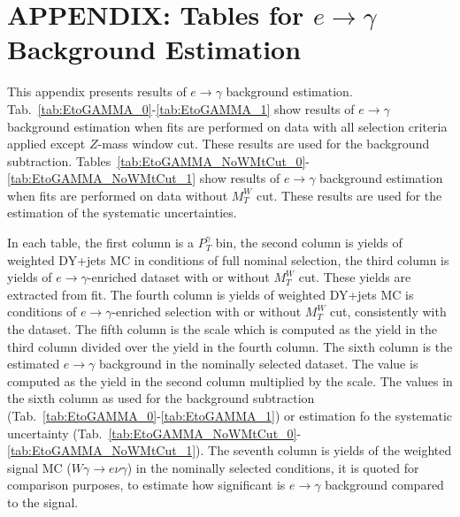 \section{APPENDIX: Tables for $e\rightarrow\gamma$ Background Estimation}
\label{sec:etogTables}

This appendix presents results of $e\rightarrow\gamma$ background estimation. Tab.~\ref{tab:EtoGAMMA_0}-\ref{tab:EtoGAMMA_1} show results of $e\rightarrow\gamma$ background estimation when fits are performed on data with all selection criteria applied except $Z$-mass window cut. These results are used for the background subtraction. Tables~\ref{tab:EtoGAMMA_NoWMtCut_0}-\ref{tab:EtoGAMMA_NoWMtCut_1} show results of $e\rightarrow\gamma$ background estimation when fits are performed on data without $M_T^W$ cut. These results are used for the estimation of the systematic uncertainties.

In each table, the first column is a $P_T^{\gamma}$ bin, the second column is yields of weighted DY+jets MC in conditions of full nominal selection, the third column is yields of $e\rightarrow\gamma$-enriched dataset with or without $M_T^W$ cut. These yields are extracted from fit. The fourth column is yields of weighted DY+jets MC is conditions of $e\rightarrow\gamma$-enriched selection with or without $M_T^W$ cut, consistently with the dataset. The fifth column is the scale which is computed as the yield in the third column divided over the yield in the fourth column. The sixth column is the estimated $e\rightarrow\gamma$ background in the nominally selected dataset. The value is computed as the yield in the second column multiplied by the scale. The values in the sixth column as used for the background subtraction  (Tab.~\ref{tab:EtoGAMMA_0}-\ref{tab:EtoGAMMA_1}) or estimation fo the systematic uncertainty (Tab.~\ref{tab:EtoGAMMA_NoWMtCut_0}-\ref{tab:EtoGAMMA_NoWMtCut_1}). The seventh column is yields of the weighted signal MC ($W\gamma\rightarrow e\nu\gamma$) in the nominally selected conditions, it is quoted for comparison purposes, to estimate how significant is $e\rightarrow\gamma$ background compared to the signal.

